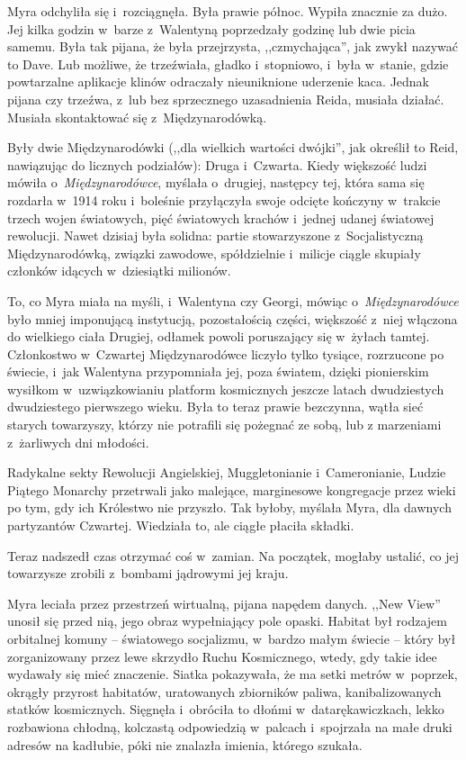 \documentclass[oneside,polish,11pt,sfheadings]{mwbk}
\begin{document}
Myra odchyliła się i~rozciągnęła. Była prawie północ. Wypiła znacznie za
dużo. Jej kilka godzin w~barze z~Walentyną poprzedzały godzinę lub dwie
picia samemu. Była tak pijana, że była przejrzysta, ,,czmychająca'', jak
zwykł nazywać to Dave. Lub możliwe, że trzeźwiała, gładko i~stopniowo, i~była w~stanie, gdzie powtarzalne aplikacje klinów odraczały nieuniknione
uderzenie kaca. Jednak pijana czy trzeźwa, z~lub bez sprzecznego
uzasadnienia Reida, musiała działać. Musiała skontaktować się z~Międzynarodówką.

Były dwie Międzynarodówki (,,dla wielkich wartości dwójki'', jak określił
to Reid, nawiązując do licznych podziałów): Druga i~Czwarta. Kiedy
większość ludzi mówiła o~\textit{Międzynarodówce}, myślała o~drugiej,
następcy tej, która sama się rozdarła w~1914 roku i~boleśnie przyłączyła
swoje odcięte kończyny w~trakcie trzech wojen światowych, pięć
światowych krachów i~jednej udanej światowej rewolucji. Nawet dzisiaj
była solidna: partie stowarzyszone z~Socjalistyczną Międzynarodówką,
związki zawodowe, spółdzielnie i~milicje ciągle skupiały członków
idących w~dziesiątki milionów.

To, co Myra miała na myśli, i~Walentyna czy Georgi, mówiąc o~\textit{Międzynarodówce} było mniej imponującą instytucją, pozostałością
części, większość z~niej włączona do wielkiego ciała Drugiej, odłamek
powoli poruszający się w~żyłach tamtej. Członkostwo w~Czwartej
Międzynarodówce liczyło tylko tysiące, rozrzucone po świecie, i~jak
Walentyna przypomniała jej, poza światem, dzięki pionierskim wysiłkom w~uzwiązkowianiu platform kosmicznych jeszcze latach dwudziestych
dwudziestego pierwszego wieku. Była to teraz prawie bezczynna, wątła
sieć starych towarzyszy, którzy nie potrafili się pożegnać ze sobą, lub
z marzeniami z~żarliwych dni młodości.

Radykalne sekty Rewolucji Angielskiej, Muggletonianie i~Cameronianie,
Ludzie Piątego Monarchy przetrwali jako malejące, marginesowe
kongregacje przez wieki po tym, gdy ich Królestwo nie przyszło. Tak
byłoby, myślała Myra, dla dawnych partyzantów Czwartej. Wiedziała to,
ale ciągłe płaciła składki.

Teraz nadszedł czas otrzymać coś w~zamian. Na początek, mogłaby ustalić,
co jej towarzysze zrobili z~bombami jądrowymi jej kraju.

Myra leciała przez przestrzeń wirtualną, pijana napędem danych. ,,New View''
unosił się przed nią, jego obraz wypełniający pole opaski. Habitat był
rodzajem orbitalnej komuny -- światowego socjalizmu, w~bardzo małym
świecie -- który był zorganizowany przez lewe skrzydło Ruchu Kosmicznego,
wtedy, gdy takie idee wydawały się mieć znaczenie. Siatka pokazywała, że
ma setki metrów w~poprzek, okrągły przyrost habitatów, uratowanych
zbiorników paliwa, kanibalizowanych statków kosmicznych. Sięgnęła i~obróciła to dłońmi w~datarękawiczkach, lekko rozbawiona chłodną,
kolczastą odpowiedzią w~palcach i~spojrzała na małe druki adresów na
kadłubie, póki nie znalazła imienia, którego szukała.
\end{document}
